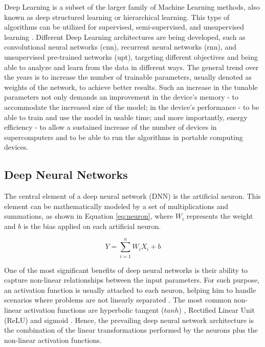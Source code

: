 Deep Learning is a subset of the larger family of Machine Learning methods, also known as deep structured learning or hierarchical learning. This type of algorithms can be utilized for supervised, semi-supervised, and unsupervised learning \cite{bengio_representation_2013, schmidhuber_deep_2015}. Different Deep Learning architectures are being developed, such as convolutional neural networks (\acrshort{cnn}), recurrent neural networks (\acrshort{rnn}), and unsupervised pre-trained networks (\acrshort{upt}), targeting different objectives and being able to analyze and learn from the data in different ways. The general trend over the years is to increase the number of trainable parameters, usually denoted as weights of the network, to achieve better results. Such an increase in the tunable parameters not only demands an improvement in the device's memory - to accommodate the increased size of the model; in the device's performance - to be able to train and use the model in usable time; and more importantly, energy efficiency - to allow a sustained increase of the number of devices in supercomputers and to be able to run the algorithms in portable computing devices.

\subsection{Deep Neural Networks}

The central element of a deep neural network (DNN) is the artificial neuron. This element can be mathematically modeled by a set of multiplications and summations, as shown in Equation \ref{eq:neuron}, where $W_i$ represents the weight and $b$ is the bias applied on each artificial neuron.

\begin{equation}
\label{eq:neuron}
    Y = \sum_{i=1}^{n} W_iX_i+b
\end{equation}

One of the most significant benefits of deep neural networks is their ability to capture non-linear relationships between the input parameters. For such purpose, an activation function is usually attached to each neuron, helping him to handle scenarios where problems are not linearly separated \cite{dong_dnnmark:_2017}. The most common non-linear activation functions are hyperbolic tangent ($tanh$) \cite{orr_neural_1998}, Rectified Linear Unit (ReLU) \cite{orr_neural_1998} and sigmoid \cite{orr_neural_1998}. Hence, the prevailing deep neural network architecture is the combination of the linear transformations performed by the neurons plus the non-linear activation functions.

